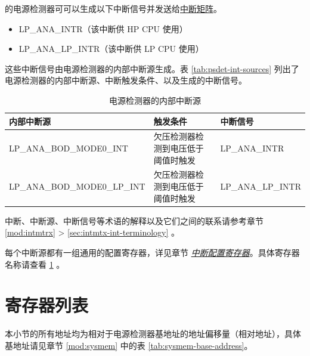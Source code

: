 \documentclass[main\_\_CN.tex]{subfiles}
\begin{document}
\chipname{} 的电源检测器可可以生成以下中断信号并发送给\hyperref[mod:intmtrx]{中断矩阵}。

    \begin{itemize}
        \item LP\_ANA\_INTR（该中断供 HP CPU 使用）
        \item LP\_ANA\_LP\_INTR（该中断供 LP CPU 使用）
    \end{itemize}

这些中断信号由电源检测器的内部中断源生成。表 \ref{tab:psdet-int-sources} 列出了电源检测器的内部中断源、中断触发条件、以及生成的中断信号。

\begin{longtable}{ |l | l | l | }
\caption{电源检测器的内部中断源} \label{tab:psdet-int-sources}
\\ \hline
\rowcolor{lightgray}
\textbf{内部中断源} & \textbf{触发条件}  &  \textbf{中断信号}\\ \hline
\label{int:LPANABODMODE0INT}LP\_ANA\_BOD\_MODE0\_INT  & 欠压检测器检测到电压低于阈值时触发  & LP\_ANA\_INTR  \\ \hline
\label{int:LPANABODMODE0LPINT}LP\_ANA\_BOD\_MODE0\_LP\_INT  & 欠压检测器检测到电压低于阈值时触发  & LP\_ANA\_LP\_INTR  \\ \hline

\end{longtable}

\begin{tiplisting}
中断、中断源、中断信号等术语的解释以及它们之间的联系请参考章节 \ref{mod:intmtrx} \textit{} > \ref{sec:intmtx-int-terminology} \textit{}。
\end{tiplisting}


每个中断源都有一组通用的配置寄存器，详见章节 \hyperref[interrupt-config-registers]{\textit{中断配置寄存器}}。具体寄存器名称请查看 \ref{sec:alias-reg-summ} \textit{}。



\newpage
\hypertarget{alias-reg-summ}{}
\section{寄存器列表}
\label{sec:alias-reg-summ}

本小节的所有地址均为相对于电源检测器基地址的地址偏移量（相对地址），具体基地址请见章节 \ref{mod:sysmem} \textit{} 中的表 \ref{tab:sysmem-base-address}。
\end{document}

